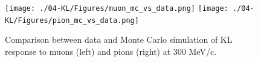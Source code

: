    \begin{figure}
   	\begin{center}
   		\texttt{[image: ./04-KL/Figures/muon\_mc\_vs\_data.png]}  		\texttt{[image: ./04-KL/Figures/pion\_mc\_vs\_data.png]}
   		\caption{Comparison between data and Monte Carlo simulation of KL response to muons (left) and pions (right) at 300 MeV/c.}
   		\label{fig:KL_mc_vs_data}
   	\end{center}
   \end{figure}
